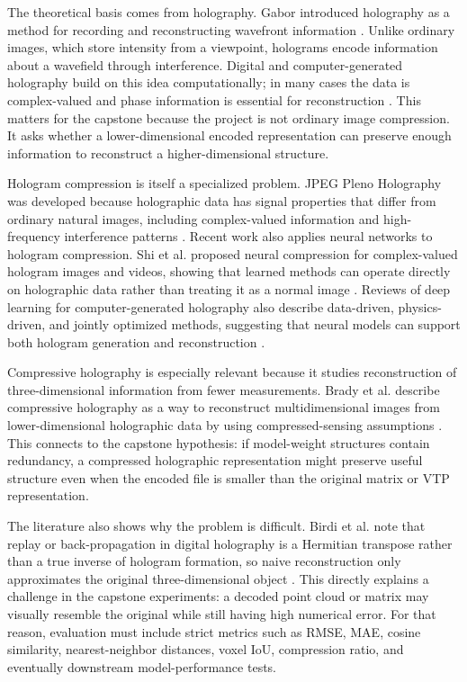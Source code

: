 \documentclass{article}
\begin{document}
\begin{normalsize}
The theoretical basis comes from holography. Gabor introduced holography as a method for recording and reconstructing wavefront information \cite{gabor1948}. Unlike ordinary images, which store intensity from a viewpoint, holograms encode information about a wavefield through interference. Digital and computer-generated holography build on this idea computationally; in many cases the data is complex-valued and phase information is essential for reconstruction \cite{goodman2005}. This matters for the capstone because the project is not ordinary image compression. It asks whether a lower-dimensional encoded representation can preserve enough information to reconstruct a higher-dimensional structure.

Hologram compression is itself a specialized problem. JPEG Pleno Holography was developed because holographic data has signal properties that differ from ordinary natural images, including complex-valued information and high-frequency interference patterns \cite{jpegpleno2024}. Recent work also applies neural networks to hologram compression. Shi et al. proposed neural compression for complex-valued hologram images and videos, showing that learned methods can operate directly on holographic data rather than treating it as a normal image \cite{shi2022neural}. Reviews of deep learning for computer-generated holography also describe data-driven, physics-driven, and jointly optimized methods, suggesting that neural models can support both hologram generation and reconstruction \cite{shimobaba2022dlch}.

Compressive holography is especially relevant because it studies reconstruction of three-dimensional information from fewer measurements. Brady et al. describe compressive holography as a way to reconstruct multidimensional images from lower-dimensional holographic data by using compressed-sensing assumptions \cite{brady2009}. This connects to the capstone hypothesis: if model-weight structures contain redundancy, a compressed holographic representation might preserve useful structure even when the encoded file is smaller than the original matrix or VTP representation.

The literature also shows why the problem is difficult. Birdi et al. note that replay or back-propagation in digital holography is a Hermitian transpose rather than a true inverse of hologram formation, so naive reconstruction only approximates the original three-dimensional object \cite{birdi2020}. This directly explains a challenge in the capstone experiments: a decoded point cloud or matrix may visually resemble the original while still having high numerical error. For that reason, evaluation must include strict metrics such as RMSE, MAE, cosine similarity, nearest-neighbor distances, voxel IoU, compression ratio, and eventually downstream model-performance tests.


\end{normalsize}
\end{document}
